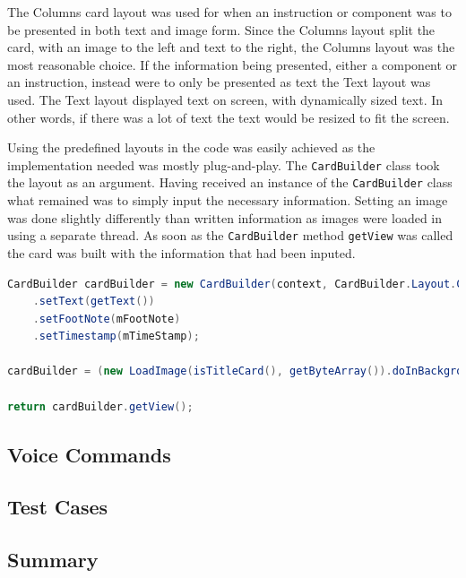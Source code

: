 The Columns card layout was used for when an instruction or component was to be presented in both text and image form. Since the Columns layout split the card, with an image to the left and text to the right, the Columns layout was the most reasonable choice. If the information being presented, either a component or an instruction, instead were to only be presented as text the Text layout was used. The Text layout displayed text on screen, with dynamically sized text. In other words, if there was a lot of text the text would be resized to fit the screen.

Using the predefined layouts in the code was easily achieved as the implementation needed was mostly plug-and-play. The \texttt{CardBuilder} class took the layout as an argument. Having received an instance of the \texttt{CardBuilder} class what remained was to simply input the necessary information. Setting an image was done slightly differently than written information as images were loaded in using a separate thread. As soon as the \texttt{CardBuilder} method \texttt{getView} was called the card was built with the information that had been inputed.

\begin{lstlisting}[language=Java, caption={Initialisation of the CardBuilder class}, label=todo]
CardBuilder cardBuilder = new CardBuilder(context, CardBuilder.Layout.COLUMNS)
	.setText(getText())
	.setFootNote(mFootNote)
	.setTimestamp(mTimeStamp);

cardBuilder = (new LoadImage(isTitleCard(), getByteArray()).doInBackground(cardBuilder));

return cardBuilder.getView();
\end{lstlisting}


\subsection{Voice Commands}


\subsection{Test Cases}


\subsection{Summary}
\label{subsec:summary}


